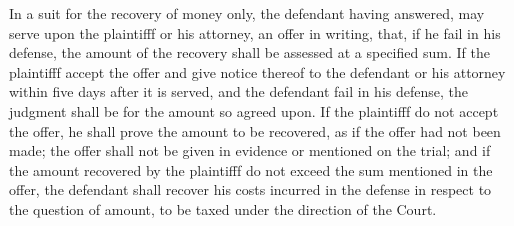In a suit for the recovery of money only, the defendant having answered, may serve upon the plaintifff or his attorney, an offer in writing, that, if he fail in his defense, the amount of the recovery shall be assessed at a specified sum.  If the plaintifff accept the offer and give notice thereof to the defendant or his attorney within five days after it is served, and the defendant fail in his defense, the judgment shall be for the amount so agreed upon.  If the plaintifff do not accept the offer, he shall prove the amount to be recovered, as if the offer had not been made; the offer shall not be given in evidence or mentioned on the trial; and if the amount recovered by the plaintifff do not exceed the sum mentioned in the offer, the defendant shall recover his costs incurred in the defense in respect to the question of amount, to be taxed under the direction of the Court.